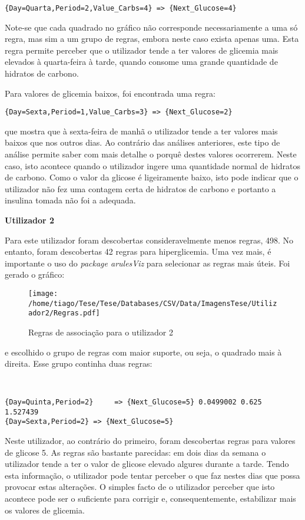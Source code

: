 \begin{lstlisting}
{Day=Quarta,Period=2,Value_Carbs=4} => {Next_Glucose=4}

\end{lstlisting}
Note-se que cada quadrado no gráfico não corresponde necessariamente a uma só regra, mas sim a um grupo de regras, embora neste caso exista apenas uma. Esta regra permite perceber que o utilizador tende a ter valores de glicemia mais elevados à quarta-feira à tarde, quando consome uma grande quantidade de hidratos de carbono.

Para valores de glicemia baixos, foi encontrada uma regra:

\begin{lstlisting}
{Day=Sexta,Period=1,Value_Carbs=3} => {Next_Glucose=2}
\end{lstlisting}
que mostra que à sexta-feira de manhã o utilizador tende a ter valores mais baixos que nos outros dias. Ao contrário das análises anteriores, este tipo de análise permite saber com mais detalhe o porquê destes valores ocorrerem. Neste caso, isto acontece quando o utilizador ingere uma quantidade normal de hidratos de carbono. Como o valor da glicose é ligeiramente baixo, isto pode indicar que o utilizador não fez uma contagem certa de hidratos de carbono e portanto a insulina tomada não foi a adequada.


\textbf{Utilizador 2}

Para este utilizador foram descobertas consideravelmente menos regras, 498. No entanto, foram descobertas 42 regras para hiperglicemia. Uma vez mais, é importante o uso do \textit{package arulesViz} para selecionar as regras mais úteis. Foi gerado o gráfico:


\begin{figure}[H]
\centering
\texttt{[image: /home/tiago/Tese/Tese/Databases/CSV/Data/ImagensTese/Utilizador2/Regras.pdf]}
\caption{Regras de associação para o utilizador 2}
\end{figure}
e escolhido o grupo de regras com maior suporte, ou seja, o quadrado mais à direita. Esse grupo continha duas regras:

\begin{lstlisting}


{Day=Quinta,Period=2}     => {Next_Glucose=5} 0.0499002 0.625      1.527439
{Day=Sexta,Period=2} => {Next_Glucose=5}

\end{lstlisting}
Neste utilizador, ao contrário do primeiro, foram descobertas regras para valores de glicose 5. As regras são bastante parecidas: em dois dias da semana o utilizador tende a ter o valor de glicose elevado algures durante a tarde. Tendo esta informação, o utilizador pode tentar perceber o que faz nestes dias que possa provocar estas alterações. O simples facto de o utilizador perceber que isto acontece pode ser o suficiente para corrigir e, consequentemente, estabilizar mais os valores de glicemia.


